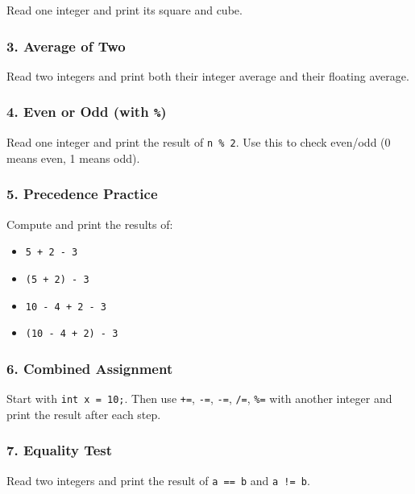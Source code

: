 \documentclass[
  letterpaper,
  DIV=11,
  numbers=noendperiod]{scrreprt}
\providecommand{\tightlist}{%
  \setlength{\itemsep}{0pt}\setlength{\parskip}{0pt}}
\begin{document}
Read one integer and print its square and cube.

\subsubsection{3. Average of Two}\label{average-of-two}

Read two integers and print both their integer average and their
floating average.

\subsubsection{\texorpdfstring{4. Even or Odd (with
\texttt{\%})}{4. Even or Odd (with \%)}}\label{even-or-odd-with}

Read one integer and print the result of \texttt{n\ \%\ 2}. Use this to
check even/odd (0 means even, 1 means odd).

\subsubsection{5. Precedence Practice}\label{precedence-practice}

Compute and print the results of:

\begin{itemize}
\tightlist
\item
  \texttt{5\ +\ 2\ -\ 3}
\item
  \texttt{(5\ +\ 2)\ -\ 3}
\item
  \texttt{10\ -\ 4\ +\ 2\ -\ 3}
\item
  \texttt{(10\ -\ 4\ +\ 2)\ -\ 3}
\end{itemize}

\subsubsection{6. Combined Assignment}\label{combined-assignment}

Start with \texttt{int\ x\ =\ 10;}. Then use \texttt{+=}, \texttt{-=},
\texttt{-=}, \texttt{/=}, \texttt{\%=} with another integer and print
the result after each step.

\subsubsection{7. Equality Test}\label{equality-test}

Read two integers and print the result of \texttt{a\ ==\ b} and
\texttt{a\ !=\ b}.
\end{document}

